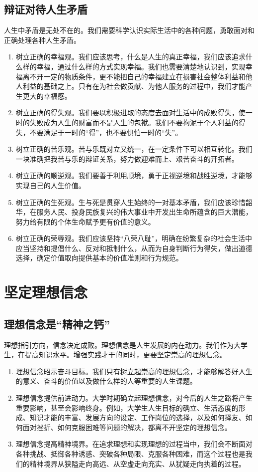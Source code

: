 \subsection{辩证对待人生矛盾}
人生中矛盾是无处不在的。我们需要科学认识实际生活中的各种问题，勇敢面对和正确处理各种人生矛盾。
\begin{enumerate}
\item 树立正确的幸福观。我们应该思考，什么是人生的真正幸福，我们应该追求什么样的幸福，通过什么样的方式实现幸福。我们也需要清楚地认识到，实现幸福离不开一定的物质条件，更不能把自己的幸福建立在损害社会整体利益和他人利益的基础之上。只有在为社会做贡献、为他人服务的过程中，我们才能产生更大的幸福感。
\item 树立正确的得失观。我们要以积极进取的态度去面对生活中的成败得失，使一时的失败成为人生的财富而不是人生的包袱。我们不要拘泥于个人利益的得失，不要满足于一时的“得”，也不要惧怕一时的“失”。
\item 树立正确的苦乐观。苦与乐既对立又统一，在一定条件下可以相互转化。我们一块准确把我苦与乐的辩证关系，努力做迎难而上、艰苦奋斗的开拓者。
\item 树立正确的顺逆观。我们要善于利用顺境，勇于正视逆境和战胜逆境，才能够实现自己的人生价值。
\item 树立正确的生死观。生与死是贯穿人生始终的一对基本矛盾，我们应该珍惜韶华，在服务人民、投身民族复兴的伟大事业中开发出生命所蕴含的巨大潜能，努力给有限的个体生命赋予更有价值的意义。
\item 树立正确的荣辱观。我们应该坚持“八荣八耻”，明确在纷繁复杂的社会生活中应当坚持和提倡什么、反对和抵制什么，从而为自身判断行为得失，做出道德选择，确定价值取向提供基本的价值准则和行为规范。
\end{enumerate}

\section{坚定理想信念}

\subsection{理想信念是“精神之钙”}
理想指引方向，信念决定成败。理想信念是人生发展的内在动力。我们作为大学生，在提高知识水平。增强实践才干的同时，更要坚定崇高的理想信念。
\begin{enumerate}
\item 理想信念昭示奋斗目标。我们只有树立起崇高的理想信念，才能够解答好人生的意义、奋斗的价值以及做什么样的人等重要的人生课题。
\item 理想信念提供前进动力。大学时期确立起理想信念，对今后的人生之路将产生重要影响，甚至会影响终身。例如，大学生人生目标的确立、生活态度的形成、知识才能的丰富、发展方向的设定、工作岗位的选择，以及如何择友、如何面对挫折、如何克服困难等问题的解决，都离不开坚定的理想信念。
\item 理想信念提高精神境界。在追求理想和实现理想的过程当中，我们会不断面对各种挑战、抵御各种诱惑、突破各种局限、克服各种困难，而这个过程也是我们的精神境界从狭隘走向高远、从空虚走向充实、从犹疑走向执着的过程。
\end{enumerate}

